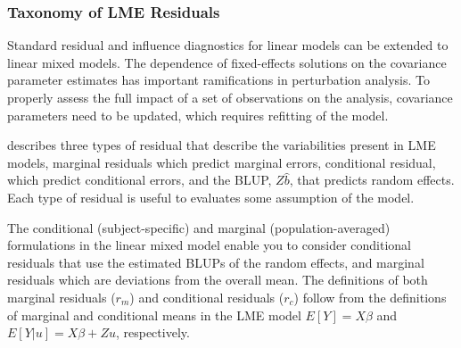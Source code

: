 \documentclass[12pt, a4paper]{report}
\theoremstyle{definition}
\theoremstyle{remark}
\begin{document}


%





\subsubsection{Taxonomy of LME Residuals}
Standard residual and influence diagnostics for linear models can
be extended to linear mixed models. The dependence of
fixed-effects solutions on the covariance parameter estimates has
important ramifications in perturbation analysis. To properly assess the
full impact of a set of observations on the analysis, covariance
parameters need to be updated, which requires refitting of the
model.

\citet{PB} describes three types of residual that describe the variabilities
present in LME models, marginal residuals which predict marginal errors, conditional residual, which predict conditional errors, and the BLUP, $ {Z\hat{b}}$, that predicts random effects. Each type of residual is useful to evaluates some assumption of the model.

The conditional (subject-specific) and marginal (population-averaged) formulations in the linear mixed model enable you to consider conditional residuals that use the estimated BLUPs of the random effects, and marginal residuals which are deviations from the overall mean. The definitions of both marginal residuals ($r_m$) and conditional residuals ($r_c$) follow from the definitions of marginal and conditional means in the LME model 
$E[{Y}] = {X}{\beta}$ and $E[{Y|{u}}] = {X}{\beta} + {Z}{u}$, respectively.
\end{document}
